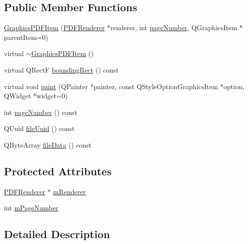 \subsection*{Public Member Functions}
\begin{DoxyCompactItemize}
\item 
\hyperlink{class_graphics_p_d_f_item_a3633a0f7f9b0764332698d48e01dcbe7}{Graphics\-P\-D\-F\-Item} (\hyperlink{class_p_d_f_renderer}{P\-D\-F\-Renderer} $\ast$renderer, int \hyperlink{class_graphics_p_d_f_item_a7d6a6f4a9eaaea2125bff9244fed220a}{page\-Number}, Q\-Graphics\-Item $\ast$parent\-Item=0)
\item 
virtual \hyperlink{class_graphics_p_d_f_item_a7484b4d3e1ae9088f13f3efcb013a264}{$\sim$\-Graphics\-P\-D\-F\-Item} ()
\item 
virtual Q\-Rect\-F \hyperlink{class_graphics_p_d_f_item_af1b11e64d80932d6ffe57334183162fc}{bounding\-Rect} () const 
\item 
virtual void \hyperlink{class_graphics_p_d_f_item_a8db7a0767ad2778f3e07608b704988cb}{paint} (Q\-Painter $\ast$painter, const Q\-Style\-Option\-Graphics\-Item $\ast$option, Q\-Widget $\ast$widget=0)
\item 
int \hyperlink{class_graphics_p_d_f_item_a7d6a6f4a9eaaea2125bff9244fed220a}{page\-Number} () const 
\item 
Q\-Uuid \hyperlink{class_graphics_p_d_f_item_ab4c28274c449af87f373ecdbd72c777f}{file\-Uuid} () const 
\item 
Q\-Byte\-Array \hyperlink{class_graphics_p_d_f_item_af5c1a8bc9ec172214558bb1d687af72f}{file\-Data} () const 
\end{DoxyCompactItemize}
\subsection*{Protected Attributes}
\begin{DoxyCompactItemize}
\item 
\hyperlink{class_p_d_f_renderer}{P\-D\-F\-Renderer} $\ast$ \hyperlink{class_graphics_p_d_f_item_a515a4f7bc6472e2f74c403d5ce2c15d9}{m\-Renderer}
\item 
int \hyperlink{class_graphics_p_d_f_item_a7241c7fc6a0ac3459156c1678c4ecb93}{m\-Page\-Number}
\end{DoxyCompactItemize}


\subsection{Detailed Description}



